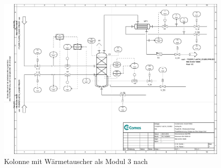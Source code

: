 \begin{figure}[h!tb]
\centering
\includegraphics[height=\textwidth,angle=90]{bilder/M03_Kolonne_mit_Waermetauscher.pdf}
\caption[PID Modul 3]{Kolonne mit W\"armetauscher als Modul 3 nach \cite{Pfeffer_2016}}
\label{fig:PIDMod3}
\end{figure}

